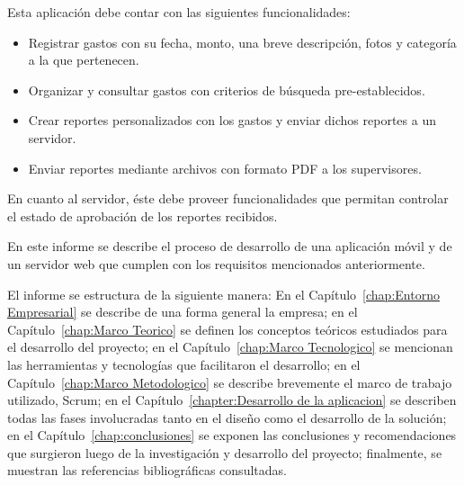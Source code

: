 
Esta aplicación debe contar con las siguientes funcionalidades:

\begin{itemize}
\item Registrar gastos con su fecha, monto, una breve descripción, fotos y categoría a la que pertenecen.
\item Organizar y consultar gastos con criterios de búsqueda pre-establecidos.
\item Crear reportes personalizados con los gastos y enviar dichos reportes a un servidor.
\item Enviar reportes mediante archivos con formato PDF a los supervisores.
\end{itemize}

En cuanto al servidor, éste debe proveer funcionalidades que permitan controlar el estado de aprobación de los reportes recibidos.

En este informe se describe el proceso de desarrollo de una aplicación móvil y de un servidor web que cumplen con los requisitos mencionados anteriormente.

El informe se estructura de la siguiente manera: En el Capítulo~\ref{chap:Entorno Empresarial} se describe de una forma general la empresa; en el Capítulo~\ref{chap:Marco Teorico} se definen los conceptos teóricos estudiados para el desarrollo del proyecto; en el Capítulo~\ref{chap:Marco Tecnologico} se mencionan las herramientas y tecnologías que facilitaron el desarrollo; en el Capítulo~\ref{chap:Marco Metodologico} se describe brevemente el marco de trabajo utilizado, Scrum; en el Capítulo~\ref{chapter:Desarrollo de la aplicacion} se describen todas las fases involucradas tanto en el diseño como el desarrollo de la solución; en el Capítulo~\ref{chap:conclusiones} se exponen las conclusiones y recomendaciones que surgieron luego de la investigación y desarrollo del proyecto; finalmente, se muestran las referencias bibliográficas consultadas.